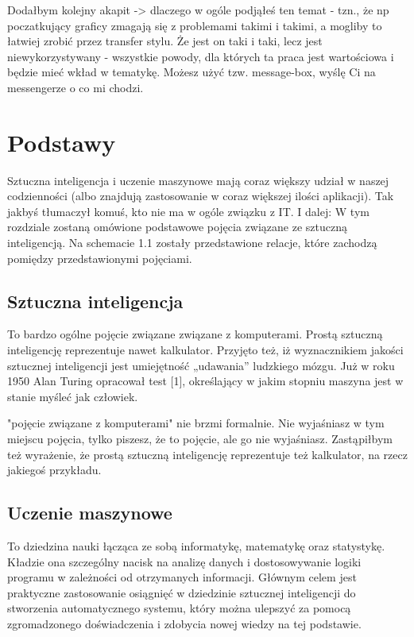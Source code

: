 \documentclass[brudnopis]{xmgr}
\begin{document}
Dodałbym kolejny akapit -> dlaczego w ogóle podjąłeś ten temat - tzn., że np poczatkujący graficy zmagają się z problemami takimi i takimi, a mogliby to łatwiej zrobić przez transfer stylu. Że jest on taki i taki, lecz jest niewykorzystywany - wszystkie powody, dla których ta praca jest wartościowa i będzie mieć wkład w tematykę. Możesz użyć tzw. message-box, wyślę Ci na messengerze o co mi chodzi.


\chapter{Podstawy\label{s:dtd}}

Sztuczna inteligencja i uczenie maszynowe mają coraz większy udział w naszej codzienności (albo znajdują zastosowanie w coraz większej ilości aplikacji). Tak jakbyś tłumaczył komuś, kto nie ma w ogóle związku z IT. I dalej: W tym rozdziale zostaną omówione podstawowe pojęcia związane ze sztuczną inteligencją. Na schemacie 1.1 zostały przedstawione relacje, które zachodzą pomiędzy przedstawionymi pojęciami.

\section{Sztuczna inteligencja}

To bardzo ogólne pojęcie związane związane z komputerami. Prostą sztuczną inteligencję reprezentuje nawet kalkulator. Przyjęto też, iż wyznacznikiem jakości sztucznej inteligencji jest umiejętność „udawania” ludzkiego mózgu. Już w roku 1950 Alan Turing opracował test [1], określający w jakim stopniu maszyna jest w stanie myśleć jak człowiek.

"pojęcie związane z komputerami" nie brzmi formalnie. Nie wyjaśniasz w tym miejscu pojęcia, tylko piszesz, że to pojęcie, ale go nie wyjaśniasz. Zastąpiłbym też wyrażenie, że prostą sztuczną inteligencję reprezentuje też kalkulator, na rzecz jakiegoś przykładu.

\section{Uczenie maszynowe}

To dziedzina nauki łącząca ze sobą informatykę, matematykę oraz statystykę. Kładzie ona szczególny nacisk na analizę danych i dostosowywanie logiki programu w zależności od otrzymanych informacji. Głównym celem jest praktyczne zastosowanie osiągnięć w dziedzinie sztucznej inteligencji do stworzenia automatycznego systemu, który można ulepszyć za pomocą zgromadzonego doświadczenia i zdobycia nowej wiedzy na tej podstawie.
\end{document}
